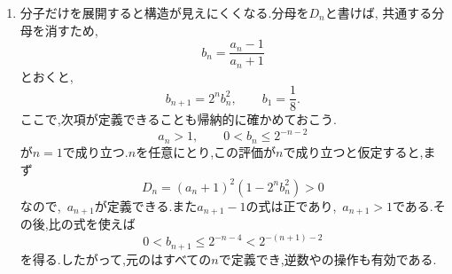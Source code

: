 \begin{enumerate}[label=\textbf{問\arabic*.},leftmargin=3.8em,format=\bookitemlink{practice-advanced}{solution}{problem}]
                \noindent \textbf{【別解】}\\
                を取らずに,積と商を作っても分離できる.
                \[
                  P_n=a_nb_n,\qquad R_n=\frac{a_n}{b_n}
                \]
                とおくと,
\BookMathLayout{
\[
\begin{aligned}
P_{n+1}&=P_n^3,\quad P_1=4,\\
R_{n+1}&=2^{4n+2}R_n,\quad R_1=1.
\end{aligned}
\]
}{
\[
\begin{aligned}
P_{n+1}&=P_n^3,\quad P_1=4,\\
R_{n+1}&=2^{4n+2}R_n,\quad R_1=1.
\end{aligned}
\]
}
                よって,
                \[
                  P_n=2^{\,2\cdot3^{n-1}},\qquad
                  R_n=2^{\,2(n^2-1)}.
                \]
                正値を使って$a_n=\sqrt{P_nR_n}$,\, $\displaystyle b_n=\sqrt{\frac{P_n}{R_n}}$と戻せば同じ答えになる.の和と差は,元のの積と商に対応する.
          \item 分子だけを展開すると構造が見えにくくなる.分母を$D_n$と書けば,
\BookMathLayout{\[
                 a_{n+1}-1=\frac{2^{n+1}(a_n-1)^2}{D_n},
                 \qquad
                 a_{n+1}+1=\frac{2(a_n+1)^2}{D_n}.
                \]}{
\[
\begin{aligned}
a_{n+1}-1&=\frac{2^{n+1}(a_n-1)^2}{D_n},\\
a_{n+1}+1&=\frac{2(a_n+1)^2}{D_n}.
\end{aligned}
\]
}
                共通する分母を消すため,
                \[
                  b_n=\frac{a_n-1}{a_n+1}
                \]
                とおくと,
                \[
                  b_{n+1}=2^n b_n^2,\qquad b_1=\frac18.
                \]
                ここで,次項が定義できることも帰納的に確かめておこう.
                \[
                  a_n>1,\qquad 0<b_n\le2^{-n-2}
                \]
                が$n=1$で成り立つ.$n$を任意にとり,この評価が$n$で成り立つと仮定すると,まず
                \[
                  D_n=(a_n+1)^2(1-2^nb_n^2)>0
                \]
                なので,\, $a_{n+1}$が定義できる.また$a_{n+1}-1$の式は正であり,\, $a_{n+1}>1$である.その後,比の式を使えば
                \[
                  0<b_{n+1}\le2^{-n-4}<2^{-(n+1)-2}
                \]
                を得る.したがって,元のはすべての$n$で定義でき,逆数やの操作も有効である.


\end{enumerate}
